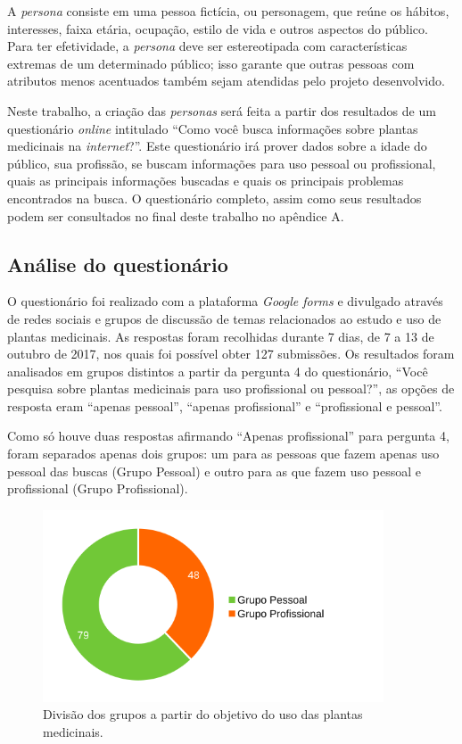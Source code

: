 A \emph{persona} consiste em uma pessoa fictícia, ou personagem, que reúne os hábitos, interesses, faixa etária, ocupação, estilo de vida e outros aspectos do público. Para ter efetividade, a \emph{persona} deve ser estereotipada com características extremas de um determinado público; isso garante que outras pessoas com atributos menos acentuados também sejam atendidas pelo projeto desenvolvido.

Neste trabalho, a criação das \emph{personas} será feita a partir dos resultados de um questionário \emph{online} intitulado ``Como você busca informações sobre plantas medicinais na \emph{internet}?''. Este questionário irá prover dados sobre a idade do público, sua profissão, se buscam informações para uso pessoal ou profissional, quais as principais informações buscadas e quais os principais problemas encontrados na busca. O questionário completo, assim como seus resultados podem ser consultados no final deste trabalho no apêndice A.

\subsection{Análise do questionário}\label{analise-do-questionario}

O questionário foi realizado com a plataforma \emph{Google forms} e divulgado através de redes sociais e grupos de discussão de temas relacionados ao estudo e uso de plantas medicinais. As respostas foram recolhidas durante 7 dias, de 7 a 13 de outubro de 2017, nos quais foi possível obter 127 submissões. Os resultados foram analisados em grupos distintos a partir da pergunta 4 do questionário, ``Você pesquisa sobre plantas medicinais para uso profissional ou pessoal?'', as opções de resposta eram ``apenas pessoal'', ``apenas profissional'' e ``profissional e pessoal''.

Como só houve duas respostas afirmando ``Apenas profissional'' para pergunta 4, foram separados apenas dois grupos: um para as pessoas que fazem apenas uso pessoal das buscas (Grupo Pessoal) e outro para as que fazem uso pessoal e profissional (Grupo Profissional).

\begin{figure}[!htbp]
\centering
\caption{\label{graf-propes}Divisão dos grupos a partir do objetivo do uso das plantas medicinais.}
\includegraphics[width=0.9\textwidth]{images/drive/image_12.png}
\end{figure}


